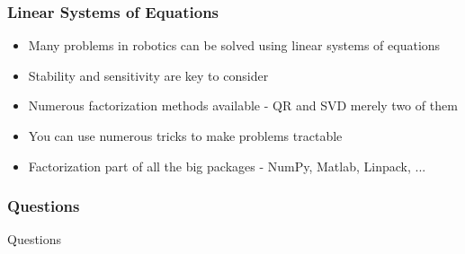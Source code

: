 \documentclass[10pt]{beamer}
\begin{document}
\begin{frame}
  \frametitle{Linear Systems of Equations}
  \begin{itemize}
  \item Many problems in robotics can be solved using linear systems of equations
  \item Stability and sensitivity are key to consider
  \item Numerous factorization methods available - QR and SVD merely two of them
  \item You can use numerous tricks to make problems tractable
  \item Factorization part of all the big packages - NumPy, Matlab, Linpack, ... 
  \end{itemize}
\end{frame}

\begin{frame}
  \frametitle{Questions}
  \centerline{\Huge Questions}
\end{frame}
\end{document}
